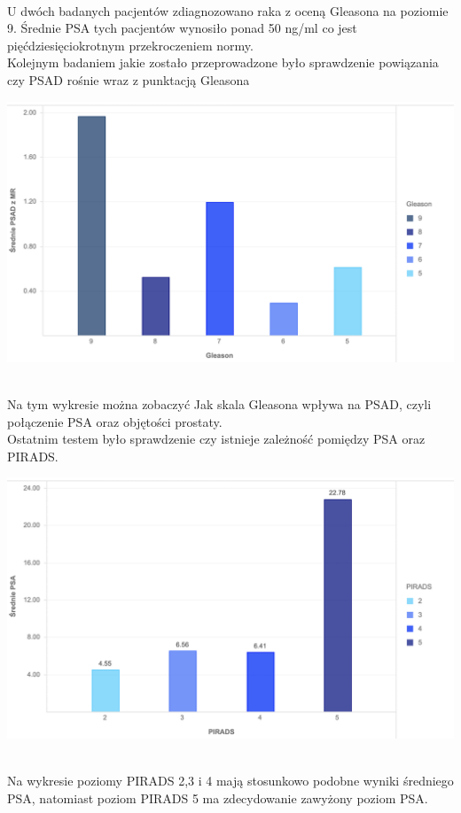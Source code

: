 \documentclass[a4paper,11pt,twoside]{report}
\theoremstyle{definition}
\begin{document}
\\
U dwóch badanych pacjentów zdiagnozowano raka z oceną Gleasona na poziomie 9. Średnie PSA tych pacjentów wynosiło ponad 50 ng/ml co jest pięćdziesięciokrotnym przekroczeniem normy.
\\
Kolejnym badaniem jakie zostało przeprowadzone było sprawdzenie powiązania czy PSAD rośnie wraz z punktacją Gleasona
\\
\begin{minipage}[h]{\linewidth}
	\centering
	\includegraphics[width=\textwidth]{Wykresy/PSADGleason.png}
\end{minipage}
\\
Na tym wykresie można zobaczyć Jak skala Gleasona wpływa na PSAD, czyli połączenie PSA oraz objętości prostaty. 
\\
Ostatnim testem było sprawdzenie czy istnieje zależność pomiędzy PSA oraz PIRADS.
\\
\begin{minipage}[h]{\linewidth}
	\centering
	\includegraphics[width=\textwidth]{Wykresy/PIRADSPSA.png}
\end{minipage}
\\
Na wykresie poziomy PIRADS 2,3 i 4 mają stosunkowo podobne wyniki średniego PSA, natomiast poziom PIRADS 5 ma zdecydowanie zawyżony poziom PSA. 
\end{document}
